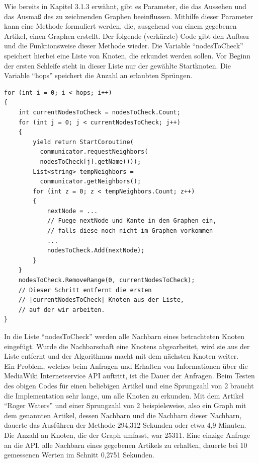 \documentclass[12pt, a4paper]{article}
\begin{document}
Wie bereits in Kapitel 3.1.3 erwähnt, gibt es Parameter, die das Aussehen und das Ausmaß des zu zeichnenden Graphen beeinflussen. Mithilfe dieser Parameter kann eine Methode formuliert werden, die, ausgehend von einem gegebenen Artikel, einen Graphen erstellt. Der folgende (verkürzte) Code gibt den Aufbau und die Funktionsweise dieser Methode wieder. Die Variable "`nodesToCheck"' speichert hierbei eine Liste von Knoten, die erkundet werden sollen. Vor Beginn der ersten Schleife steht in dieser Liste nur der gewählte Startknoten. Die Variable "`hops"' speichert die Anzahl an erlaubten Sprüngen.
\begin{lstlisting}
for (int i = 0; i < hops; i++)
{
	int currentNodesToCheck = nodesToCheck.Count;
	for (int j = 0; j < currentNodesToCheck; j++)
	{
		yield return StartCoroutine(
          communicator.requestNeighbors(
          nodesToCheck[j].getName()));
		List<string> tempNeighbors =
          communicator.getNeighbors();
		for (int z = 0; z < tempNeighbors.Count; z++)
		{
			nextNode = ...
			// Fuege nextNode und Kante in den Graphen ein,
			// falls diese noch nicht im Graphen vorkommen
			... 
			nodesToCheck.Add(nextNode);
		}
	}
	nodesToCheck.RemoveRange(0, currentNodesToCheck);
	// Dieser Schritt entfernt die ersten
    // |currentNodesToCheck| Knoten aus der Liste,
    // auf der wir arbeiten.
}
\end{lstlisting}
In die Liste "`nodesToCheck"' werden alle Nachbarn eines betrachteten Knoten eingefügt. Wurde die Nachbarschaft eine Knotens abgearbeitet, wird sie aus der Liste entfernt und der Algorithmus macht mit dem nächsten Knoten weiter.\\

Ein Problem, welches beim Anfragen und Erhalten von Informationen über die MediaWiki Internetservice API auftritt, ist die Dauer der Anfragen. Beim Testen des obigen Codes für einen beliebigen Artikel und eine Sprungzahl von 2 braucht die Implementation sehr lange, um alle Knoten zu erkunden. Mit dem Artikel "`Roger Waters"' und einer Sprungzahl von 2 beispielsweise, also ein Graph mit dem genannten Artikel, dessen Nachbarn und die Nachbarn dieser Nachbarn, dauerte das Ausführen der Methode 294,312 Sekunden oder etwa 4,9 Minuten. Die Anzahl an Knoten, die der Graph umfasst, war 25311. Eine einzige Anfrage an die API, alle Nachbarn eines gegebenen Artikels zu erhalten, dauerte bei 10 gemessenen Werten im Schnitt 0,2751 Sekunden.\\

\newpage
\end{document}
